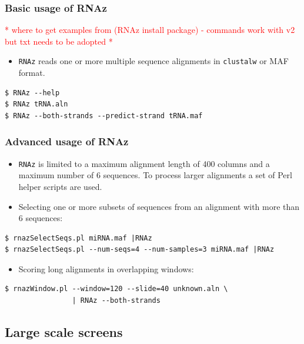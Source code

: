 \documentclass[a4paper]{article}
\newcommand{\frametitle}[1]{\subsubsection{#1}}
\newcommand{\TODO}[1]{{\textcolor{red}{* #1 *}}}
\begin{document}


  \frametitle{Basic usage of RNAz}
\TODO{where to get examples from (RNAz install package) - commands work with v2 but txt needs to be adopted}
  \begin{itemize}
  \item \texttt{RNAz} reads one or more multiple sequence alignments in \texttt{clustalw} or
    MAF format.
  \end{itemize}

\small
\begin{verbatim}
$ RNAz --help
$ RNAz tRNA.aln
$ RNAz --both-strands --predict-strand tRNA.maf
\end{verbatim}
\normalsize



  \frametitle{Advanced usage of RNAz}

  \begin{itemize}
  \item \texttt{RNAz} is limited to a maximum alignment length of 400 columns and a
    maximum number of 6 sequences. To process larger alignments a set of
    Perl helper scripts are used.
  \item Selecting one or more subsets of sequences from an alignment with
    more than 6 sequences:
  \end{itemize}

  \small
\begin{verbatim}
$ rnazSelectSeqs.pl miRNA.maf |RNAz
$ rnazSelectSeqs.pl --num-seqs=4 --num-samples=3 miRNA.maf |RNAz
\end{verbatim}
  \normalsize
  \begin{itemize}
    \item Scoring long alignments in overlapping windows:
  \end{itemize}
  \small
\begin{verbatim}
$ rnazWindow.pl --window=120 --slide=40 unknown.aln \
                | RNAz --both-strands
\end{verbatim}
  \normalsize


\subsection{Large scale screens}
\end{document}
